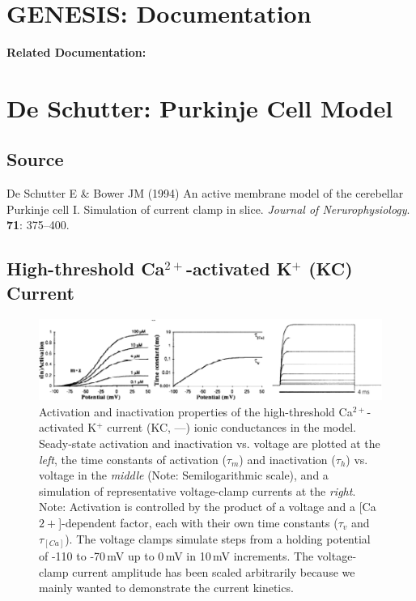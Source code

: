 \documentclass[12pt]{article}
\begin{document}
\section*{GENESIS: Documentation}

{\bf Related Documentation:}

\section*{De Schutter: Purkinje Cell Model}

\subsection*{Source}

De Schutter E \& Bower JM (1994) An active membrane model of the cerebellar Purkinje cell I. Simulation of current clamp in slice. {\it Journal of Nerurophysiology}. {\bf 71}: 375--400. \\

\subsection*{High-threshold Ca$^{2+}$-activated K$^+$ (KC) Current}

\begin{figure}[h]
\centering
   \includegraphics[scale=0.75]{figures/DS1.2G.eps}
   \caption{Activation and inactivation properties of the high-threshold Ca$^{2+}$-activated K$^+$ current (KC, ---) ionic conductances in the model. Seady-state activation and inactivation vs. voltage are plotted at the {\em left}, the time constants of activation ($\tau_m$) and inactivation ($\tau_h$) vs. voltage in the {\em middle} (Note: Semilogarithmic scale), and a simulation of representative voltage-clamp currents at the {\em right}. Note: Activation is controlled by the product of a voltage and a [Ca${2+}$]-dependent factor, each with their own time constants ($\tau_v$ and $\tau_{[Ca]}$). The voltage clamps simulate steps from a holding potential of -110 to -70\,mV up to 0\,mV in 10\,mV increments. The voltage-clamp current amplitude has been scaled arbitrarily because we mainly wanted to demonstrate the current kinetics.}
   \label{fig:DS1.2G}
\end{figure}
\end{document}
